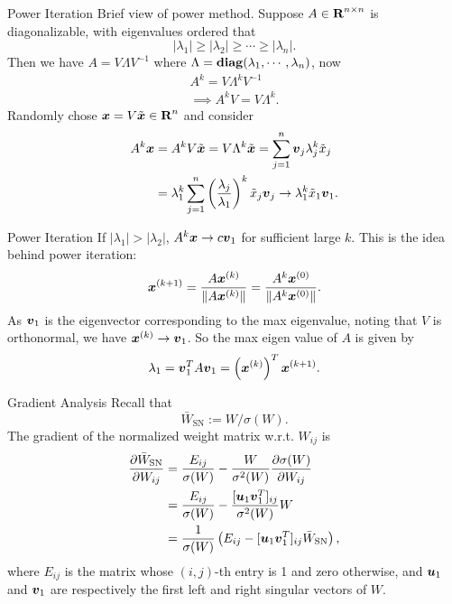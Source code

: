 \documentclass[xcolor={svgnames}]{beamer}
\newcommand{\snmat}{\bar{W}_{\mathrm{SN}}}
\begin{document}
\begin{frame}{Power Iteration}
  Brief view of power method. Suppose $A \in {\mbox{\bf R}}^{n \times n}$ is 
  diagonalizable, with eigenvalues ordered that
  \[
    |\lambda_1| \ge |\lambda_2| \ge \cdots \ge |\lambda_n|.
  \]
  Then we have $A = V\Lambda V^{-1}$ where $\Lambda = \mathop{\bf diag}(\lambda_1, \cdots,
  \lambda_n)$, now
  \[
    \begin{gathered}
      A^k = V \Lambda^k V^{-1} \\
      \implies A^k V = V\Lambda^{k}.
    \end{gathered}
  \]
  Randomly chose $\boldsymbol{x} = V \tilde{\boldsymbol{x}} \in {\mbox{\bf R}}^n$ and consider
  \[
    \begin{split}
      A^k \boldsymbol{x} &= A^k V \tilde{\boldsymbol{x}} = V \Lambda^k \tilde{\boldsymbol{x}}
      = \sum_{j=1}^n \boldsymbol{v}_j \lambda_j^k \tilde{x}_j \\
      &= \lambda_1^k \sum_{j=1}^n \left( \frac{\lambda_j}{\lambda_1} \right)^k
      \tilde{x}_j \boldsymbol{v}_j 
      \to
      \lambda_1^k \tilde{x}_1 \boldsymbol{v}_1.
    \end{split}
  \]
\end{frame}
\begin{frame}{Power Iteration}
  If $|\lambda_1| > |\lambda_2|$, $A^k \boldsymbol{x} \to c\boldsymbol{v}_1$ for sufficient
  large $k$. This is the idea behind power iteration:
  \[
    \boldsymbol{x}^{(k+1)} = \frac{A \boldsymbol{x}^{(k)}}{ \lVert A \boldsymbol{x}^{(k)} \rVert}
    = \frac{A^k \boldsymbol{x}^{(0)}}{ \lVert A^k \boldsymbol{x}^{(0)} \rVert}.
  \]
  As $\boldsymbol{v}_1$ is the eigenvector corresponding to the max 
  eigenvalue, noting that $V$ is orthonormal, we have 
  $\boldsymbol{x}^{(k)} \to \boldsymbol{v}_1$. So the max eigen value of $A$ is given by
  \[
    \lambda_1 = \boldsymbol{v}_1^T A \boldsymbol{v}_1 = 
    \left(\boldsymbol{x}^{(k)}\right)^T \boldsymbol{x}^{(k+1)}. 
  \]
\end{frame}
\begin{frame}{Gradient Analysis}
  Recall that
  \[
    \bar{W}_{\mathrm{SN}} := W / \sigma(W).
  \]
  The gradient of the normalized weight matrix w.r.t. $W_{ij}$ is
  \begin{align}
    \frac{\partial \snmat}{\partial W_{ij}} &= 
    \frac{E_{ij}}{\sigma(W)} - 
    \frac{W}{\sigma^2(W)}\frac{\partial \sigma(W)}{\partial W_{ij}} \\
    &= \frac{E_{ij}}{\sigma(W)} -
    \frac{[\bd{u}_1 \bd{v}_1^T]_{ij}}{\sigma^2(W)}W \\
    &= \frac{1}{\sigma(W)} \left(E_{ij} - [\bd{u}_1 \bd{v}_1^T]_{ij}
    \snmat\right),
  \end{align}
  where $E_{ij}$ is the matrix whose $(i,j)$-th entry is 1 and zero otherwise,
  and $\boldsymbol{u}_1$ and $\boldsymbol{v}_1$ are respectively the first left and right
  singular vectors of $W$.
\end{frame}
\end{document}
